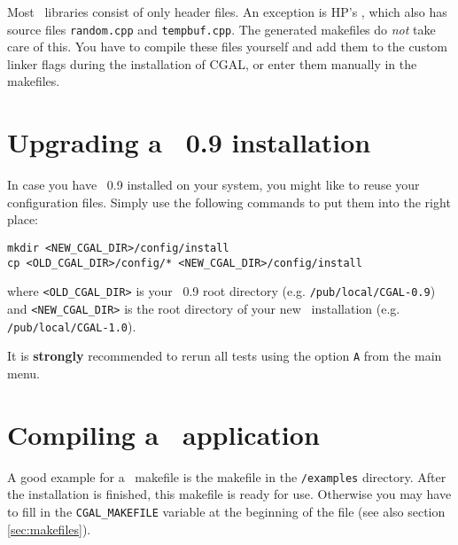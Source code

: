 Most \stl\ libraries consist of only header files. An exception is
HP's \stl, which also has source files \verb~random.cpp~ and
\verb~tempbuf.cpp~.  The generated makefiles do {\em not} take care of
this. You have to compile these files yourself and add them to the
custom linker flags during the installation of CGAL, or enter them
manually in the makefiles.

\section{Upgrading a \cgal\ 0.9 installation}

In case you have \cgal\ 0.9 installed on your system, you might like
to reuse your configuration files. Simply use the following commands
to put them into the right place:
\begin{verbatim}
mkdir <NEW_CGAL_DIR>/config/install
cp <OLD_CGAL_DIR>/config/* <NEW_CGAL_DIR>/config/install
\end{verbatim}
where {\tt <OLD\_CGAL\_DIR>} is your \cgal\ 0.9 root directory
(e.g.  {\tt /pub/local/CGAL-0.9}) and {\tt <NEW\_CGAL\_DIR>} is
the root directory of your new \cgal\ installation (e.g. {\tt
  /pub/local/CGAL-1.0}).

It is {\bf strongly} recommended to rerun all tests using the option
{\tt A} from the main menu.

\section{Compiling a \cgal\ application}
A good example for a \cgal\ makefile is the makefile in the
\texttt{\cgaldir/examples} directory. After the installation is
finished, this makefile is ready for use.  Otherwise you may have to
fill in the {\tt CGAL\_MAKEFILE} variable at the beginning of the file
(see also section \ref{sec:makefiles}).

